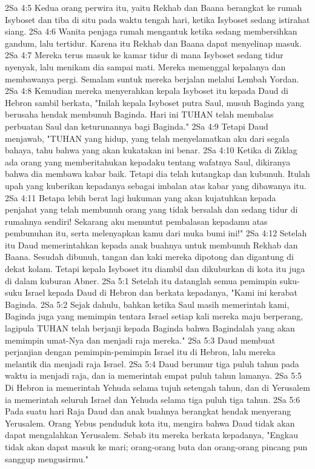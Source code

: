 2Sa 4:5  Kedua orang perwira itu, yaitu Rekhab dan Baana berangkat ke rumah Isyboset dan tiba di situ pada waktu tengah hari, ketika Isyboset sedang istirahat siang.
2Sa 4:6  Wanita penjaga rumah mengantuk ketika sedang membersihkan gandum, lalu tertidur. Karena itu Rekhab dan Baana dapat menyelinap masuk.
2Sa 4:7  Mereka terus masuk ke kamar tidur di mana Isyboset sedang tidur nyenyak, lalu menikam dia sampai mati. Mereka memenggal kepalanya dan membawanya pergi. Semalam suntuk mereka berjalan melalui Lembah Yordan.
2Sa 4:8  Kemudian mereka menyerahkan kepala Isyboset itu kepada Daud di Hebron sambil berkata, "Inilah kepala Isyboset putra Saul, musuh Baginda yang berusaha hendak membunuh Baginda. Hari ini TUHAN telah membalas perbuatan Saul dan keturunannya bagi Baginda."
2Sa 4:9  Tetapi Daud menjawab, "TUHAN yang hidup, yang telah menyelamatkan aku dari segala bahaya, tahu bahwa yang akan kukatakan ini benar.
2Sa 4:10  Ketika di Ziklag ada orang yang memberitahukan kepadaku tentang wafatnya Saul, dikiranya bahwa dia membawa kabar baik. Tetapi dia telah kutangkap dan kubunuh. Itulah upah yang kuberikan kepadanya sebagai imbalan atas kabar yang dibawanya itu.
2Sa 4:11  Betapa lebih berat lagi hukuman yang akan kujatuhkan kepada penjahat yang telah membunuh orang yang tidak bersalah dan sedang tidur di rumahnya sendiri! Sekarang aku menuntut pembalasan kepadamu atas pembunuhan itu, serta melenyapkan kamu dari muka bumi ini!"
2Sa 4:12  Setelah itu Daud memerintahkan kepada anak buahnya untuk membunuh Rekhab dan Baana. Sesudah dibunuh, tangan dan kaki mereka dipotong dan digantung di dekat kolam. Tetapi kepala Isyboset itu diambil dan dikuburkan di kota itu juga di dalam kuburan Abner.
2Sa 5:1  Setelah itu datanglah semua pemimpin suku-suku Israel kepada Daud di Hebron dan berkata kepadanya, "Kami ini kerabat Baginda.
2Sa 5:2  Sejak dahulu, bahkan ketika Saul masih memerintah kami, Baginda juga yang memimpin tentara Israel setiap kali mereka maju berperang, lagipula TUHAN telah berjanji kepada Baginda bahwa Bagindalah yang akan memimpin umat-Nya dan menjadi raja mereka."
2Sa 5:3  Daud membuat perjanjian dengan pemimpin-pemimpin Israel itu di Hebron, lalu mereka melantik dia menjadi raja Israel.
2Sa 5:4  Daud berumur tiga puluh tahun pada waktu ia menjadi raja, dan ia memerintah empat puluh tahun lamanya.
2Sa 5:5  Di Hebron ia memerintah Yehuda selama tujuh setengah tahun, dan di Yerusalem ia memerintah seluruh Israel dan Yehuda selama tiga puluh tiga tahun.
2Sa 5:6  Pada suatu hari Raja Daud dan anak buahnya berangkat hendak menyerang Yerusalem. Orang Yebus penduduk kota itu, mengira bahwa Daud tidak akan dapat mengalahkan Yerusalem. Sebab itu mereka berkata kepadanya, "Engkau tidak akan dapat masuk ke mari; orang-orang buta dan orang-orang pincang pun sanggup mengusirmu."
